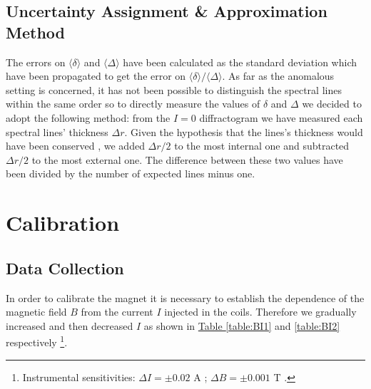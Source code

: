 \documentclass[a4paper,12pt,abstracton]{scrartcl}
\begin{document}
\subsection{Uncertainty Assignment \& Approximation Method}
The errors on $\langle \delta \rangle $ and $\langle \Delta \rangle $ have been calculated as the standard deviation which have been propagated to get the error on ${\langle \delta \rangle}/{\langle \Delta \rangle}$. 
As far as the anomalous setting is concerned, it has not been possible to distinguish the spectral lines within the same order so to directly measure the values of $\delta$ and $\Delta$ we decided to adopt the following method: 
from the $I=0$ diffractogram we have measured each spectral lines' thickness $\Delta r$. Given the hypothesis that the lines's thickness would have been conserved , we added $\Delta r/2$ to the most internal one and subtracted $\Delta r/2$ to the most external one. The difference between these two values have been divided by the number of expected lines minus one.     
\clearpage
\section{Calibration}\label{sec:cal}

\subsection{Data Collection}
In order to calibrate the magnet it is necessary to establish the dependence of the magnetic field $B$ from the current $I$ injected in the coils. Therefore we gradually increased and then decreased $I$ as shown in \hyperref[table:BI1]{Table \ref*{table:BI1}}  and \hyperref[table:BI2]{ \ref*{table:BI2}} respectively \footnote{Instrumental sensitivities: $\Delta I = \pm 0.02$ A ;  $\Delta B = \pm 0.001$ T .}. 
\end{document}
